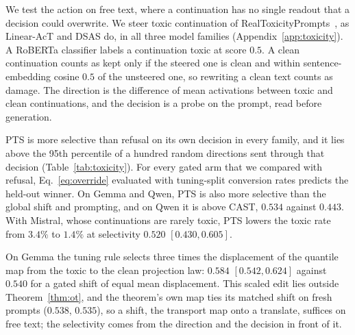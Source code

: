\documentclass{article}
\begin{document}
\begin{table}[t]\footnotesize\setlength{\tabcolsep}{2.5pt}
\centering
{}
\caption{On the first held-out prompt set (3{,}000 per model), PTS is more
selective than prompting, the global shift, CAST and refusal on its decision
in all three families. rem./kept: \% of toxic removed / clean kept;
$\Delta$Sel: row minus PTS with the shift.}
\label{tab:toxicity}
\end{table}

We test the action on free text, where a continuation has no single readout
that a decision could overwrite. We steer toxic continuation of
RealToxicityPrompts~\citep{gehman2020realtoxicityprompts}, as Linear-AcT and
DSAS do, in all three model families
(Appendix~\ref{app:toxicity}). A RoBERTa classifier labels a continuation toxic
at score $0.5$. A clean continuation counts as kept only if the steered one is
clean and within sentence-embedding cosine $0.5$ of the unsteered one, so
rewriting a clean text counts as damage. The direction is the difference of
mean activations between toxic and clean continuations, and the decision is a
probe on the prompt, read before generation.

PTS is more selective than refusal on its own decision in every family, and it
lies above the 95th percentile of a hundred random directions sent through
that decision (Table~\ref{tab:toxicity}). For every gated arm that we compared
with refusal, Eq.~\eqref{eq:override} evaluated with tuning-split conversion
rates predicts the held-out winner. On Gemma and Qwen, PTS is also
more selective than the global shift and prompting, and on Qwen it is above
CAST, $0.534$ against $0.443$. With Mistral, whose continuations are rarely
toxic, PTS lowers the toxic rate from $3.4\%$ to $1.4\%$ at selectivity $0.520$
$[0.430, 0.605]$.

On Gemma the tuning rule selects three times the displacement of the
quantile map from the toxic to the clean projection law: $0.584$
$[0.542, 0.624]$ against $0.540$ for a gated shift of equal mean displacement.
This scaled edit lies outside Theorem~\ref{thm:ot}, and the theorem's own map
ties its matched shift on fresh prompts ($0.538$, $0.535$), so a shift, the
transport map onto a translate, suffices on free text; the selectivity comes
from the direction and the decision in front of it.
\end{document}

